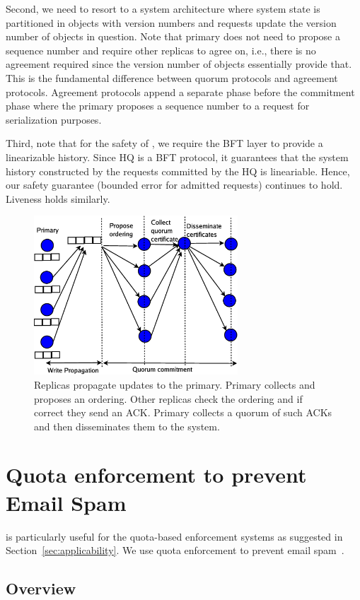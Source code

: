 \documentclass[twocolumn,10pt]{article}
\begin{document}
{Second, we need to resort to a system architecture where system state is 
partitioned in objects with version numbers and requests update the version number
of objects in question. Note that primary does not need to propose a sequence number
and require other replicas to agree on, i.e., there is no agreement required since
the version number of objects essentially provide that. This is the 
fundamental difference between quorum protocols and agreement protocols. Agreement
protocols append a separate phase before the commitment phase where the primary proposes
a sequence number to a request for serialization purposes.

Third, note that for the safety of \Sys, we require the BFT layer to provide a linearizable
history. Since HQ is a BFT protocol, it guarantees that the system history constructed by the
requests committed by the HQ is lineariable. Hence, our safety guarantee (bounded error for
admitted requests) continues to hold. Liveness holds similarly.


\begin{figure}
\centering
\includegraphics[width=3in]{protocol-diagram.eps}
\caption{Replicas propagate updates to the primary. Primary collects and proposes an ordering. Other replicas check the ordering and if correct they send an ACK. Primary collects a quorum of such ACKs and then disseminates them to the system.
}
\label{fig:protocol-diagram}
\end{figure}

\section{Quota enforcement to prevent Email Spam}
\Sys is particularly useful for the quota-based enforcement systems as suggested in 
Section~\ref{sec:applicability}. We use quota enforcement to prevent email spam~\cite{}.


\subsection{Overview}
}
\end{document}
